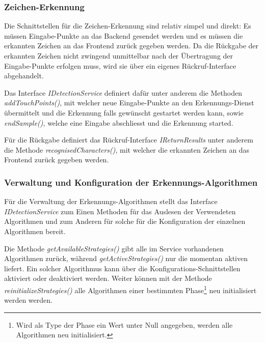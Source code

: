 \subsubsection{Zeichen-Erkennung}

Die Schnittstellen für die Zeichen-Erkennung sind relativ simpel und direkt: Es müssen Eingabe-Punkte an das Backend gesendet werden und es müssen die erkannten Zeichen an das Frontend zurück gegeben werden. Da die Rückgabe der erkannten Zeichen nicht zwingend unmittelbar nach der Übertragung der Eingabe-Punkte erfolgen muss, wird sie über ein eigenes Rückruf-Interface abgehandelt.

Das Interface \emph{IDetectionService} definiert dafür unter anderem die Methoden \emph{addTouchPoints()}, mit welcher neue Eingabe-Punkte an den Erkennungs-Dienst übermittelt und die Erkennung falls gewünscht gestartet werden kann, sowie \emph{endSample()}, welche eine Eingabe abschliesst und die Erkennung started.

Für die Rückgabe definiert das Rückruf-Interface \emph{IReturnResults} unter anderem die Methode \emph{recognisedCharacters()}, mit welcher die erkannten Zeichen an das Frontend zurück gegeben werden.

\subsubsection{Verwaltung und Konfiguration der Erkennungs-Algorithmen}

Für die Verwaltung der Erkennungs-Algorithmen stellt das Interface \emph{IDetectionService} zum Einen Methoden für das Auslesen der Verwendeten Algorithmen und zum Anderen für solche für die Konfiguration der einzelnen Algorithmen bereit.

Die Methode \emph{getAvailableStrategies()} gibt alle im Service vorhandenen Algorithmen zurück, während \emph{getActiveStrategies()} nur die momentan aktiven liefert. Ein solcher Algorithmus kann über die Konfigurations-Schnittstellen aktiviert oder deaktiviert werden. Weiter können mit der Methode \emph{reinitializeStrategies()} alle Algorithmen einer bestimmten Phase\footnote{Wird als Type der Phase ein Wert unter Null angegeben, werden alle Algorithmen neu initialisiert.} neu initialisiert werden werden.

